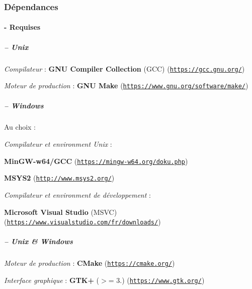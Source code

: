 \subsubsection*{Dépendances }

\paragraph*{-\/ Requises}

\subparagraph*{-- Unix}


\begin{DoxyItemize}
\item {\itshape Compilateur} \+: {\bfseries G\+NU Compiler Collection} (G\+CC) (\href{https://gcc.gnu.org/}{\tt https\+://gcc.\+gnu.\+org/})
\item {\itshape Moteur de production} \+: {\bfseries G\+NU Make} (\href{https://www.gnu.org/software/make/}{\tt https\+://www.\+gnu.\+org/software/make/})
\end{DoxyItemize}

\subparagraph*{-- Windows}

Au choix \+:
\begin{DoxyItemize}
\item {\itshape Compilateur et environment Unix} \+:
\begin{DoxyItemize}
\item {\bfseries Min\+G\+W-\/w64/\+G\+CC} (\href{https://mingw-w64.org/doku.php}{\tt https\+://mingw-\/w64.\+org/doku.\+php})
\item {\bfseries M\+S\+Y\+S2} (\href{http://www.msys2.org/}{\tt http\+://www.\+msys2.\+org/})
\end{DoxyItemize}
\item {\itshape Compilateur et environment de développement} \+:
\begin{DoxyItemize}
\item {\bfseries Microsoft Visual Studio} (M\+S\+VC) (\href{https://www.visualstudio.com/fr/downloads/}{\tt https\+://www.\+visualstudio.\+com/fr/downloads/})
\end{DoxyItemize}
\end{DoxyItemize}

\subparagraph*{-- Unix \& Windows}


\begin{DoxyItemize}
\item {\itshape Moteur de production} \+: {\bfseries C\+Make} (\href{https://cmake.org/}{\tt https\+://cmake.\+org/})
\item {\itshape Interface graphique} \+: {\bfseries  G\+T\+K+ } ($>$= 3.) (\href{https://www.gtk.org/}{\tt https\+://www.\+gtk.\+org/})
\end{DoxyItemize}

